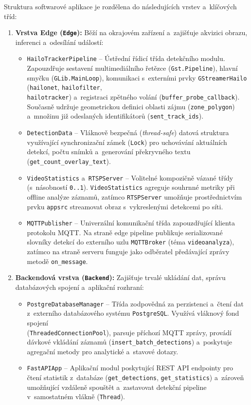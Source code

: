 Struktura softwarové aplikace je rozdělena do následujících vrstev a~klíčových tříd:
\begin{enumerate}
    \item \textbf{Vrstva Edge (\texttt{Edge}):} Běží na okrajovém zařízení a~zajišťuje akvizici obrazu, inferenci a~odesílání událostí:
    \begin{itemize}
        \item \texttt{HailoTrackerPipeline} – Ústřední řídicí třída detekčního modulu. Zapouzdřuje sestavení multimediálního řetězce (\texttt{Gst.Pipeline}), hlavní smyčku (\texttt{GLib.MainLoop}), komunikaci s~externími prvky \texttt{GStreamerHailo} (\texttt{hailonet}, \texttt{hailofilter}, \\ \texttt{hailotracker}) a~registraci zpětného volání (\texttt{buffer\_probe\_callback}). Současně udržuje geometrickou definici oblasti zájmu (\texttt{zone\_polygon}) a~množinu již odeslaných identifikátorů (\texttt{sent\_track\_ids}).
        \item \texttt{DetectionData} – Vláknově bezpečná (\textit{thread-safe}) datová struktura využívající synchronizační zámek (\texttt{Lock}) pro uchovávání aktuálních detekcí, počtu snímků a~generování překryvného textu (\texttt{get\_count\_overlay\_text}).
        \item \texttt{VideoStatistics} a~\texttt{RTSPServer} – Volitelné kompozičně vázané třídy (s~násobností \texttt{0..1}). \texttt{VideoStatistics} agreguje souhrnné metriky při offline analýze záznamů, zatímco \texttt{RTSPServer} umožňuje prostřednictvím prvku \texttt{appsrc} streamovat obraz s~vykreslenými detekcemi po síti.
        \item \texttt{MQTTPublisher} – Univerzální komunikační třída zapouzdřující klienta protokolu MQTT. Na straně edge pipeline publikuje serializované slovníky detekcí do externího uzlu \texttt{MQTTBroker} (téma \texttt{videoanalyza}), zatímco na straně serveru funguje jako odběratel předávající zprávy metodě \texttt{on\_message}.
    \end{itemize}
    
    \item \textbf{Backendová vrstva (\texttt{Backend}):} Zajišťuje trvalé ukládání dat, správu databázových spojení a~aplikační rozhraní:
    \begin{itemize}
        \item \texttt{PostgreDatabaseManager} – Třída zodpovědná za perzistenci a~čtení dat z~externího databázového systému \texttt{PostgreSQL}. Využívá vláknový fond spojení \\ (\texttt{ThreadedConnectionPool}), parsuje příchozí MQTT zprávy, provádí dávkové vkládání záznamů (\texttt{insert\_batch\_detections}) a~poskytuje agregační metody pro analytické a~stavové dotazy.
        \item \texttt{FastAPIApp} – Aplikační modul poskytující REST API endpointy pro čtení statistik z~databáze (\texttt{get\_detections}, \texttt{get\_statistics}) a~zároveň umožňující vzdáleně spouštět a~zastavovat detekční pipeline v~samostatném vlákně (\texttt{Thread}).
    \end{itemize}


\end{enumerate}

